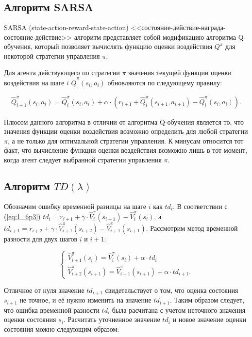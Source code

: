 \subsection{Алгоритм SARSA} \label{subsect1_6_3}
SARSA (state-action-reward-state-action) <<состояние-действие-награда-состояние-действие>> алгоритм представляет собой модификацию алгоритма Q-обучения, который позволяет вычислять функцию оценки воздействия $ Q^{\pi} $ для некоторой стратегии управления $ \pi $. 

Для агента действующего по стратегии $ \pi $ значения текущей функции оценки воздействия на шаге $ i $ $ \hat{Q}^{\pi}(s_i, a_i) $ обновляются по следующему правилу:

\begin{equation}
\label{eq:1_6p5}
\begin{alignedat}{2}
\hat{Q}^{\pi}_{i+1}(s_i, a_i) = \hat{Q}^{\pi}_{i}(s_i, a_i)+\alpha\cdot ( r_{i+1} + \hat{Q}^{\pi}_{i}(s_{i+1}, a_{i+1}) - \hat{Q}^{\pi}_{i}(s_{i}, a_i)).
\end{alignedat}
\end{equation}

Плюсом данного алгоритма в отличии от алгоритма Q-обучения является то, что значения функции оценки воздействия возможно определить для любой стратегии $ \pi $, а не только для оптимальной стратегии управления. К минусам относится тот факт, что вычисление функции оценки воздействия возможно лишь в тот момент, когда агент следует выбранной стратегии управления $ \pi $.

\subsection{Алгоритм $TD(\lambda)$} \label{subsect1_6_4}

Обозначим ошибку временной разницы на шаге $ i $ как $ td_i $. В соответствии с (\ref{eq:1_6p3}) $ td_i = r_{i+1} + \gamma\cdot\hat{V}^{\pi}_{i}(s_{i+1})-\hat{V}^{\pi}_{i}(s_{i}) $,   а $ td_{i+1} = r_{i+2} + \gamma\cdot\hat{V}^{\pi}_{i+1}(s_{i+2})-\hat{V}^{\pi}_{i+1}(s_{i+1}) $. Рассмотрим метод временной разности для двух шагов $ i $ и $ i+1 $:

$$
 \begin{cases}
  \hat{V}^{\pi}_{i+1}(s_i) = \hat{V}^{\pi}_{i}(s_i)+\alpha\cdot td_i \\
  \hat{V}^{\pi}_{i+2}(s_{i+1}) = \hat{V}^{\pi}_{i+1}(s_{i+1})+\alpha\cdot td_{i+1}.
 \end{cases}
$$

Отличное от нуля значение $ td_{i+1} $ свидетельствует о том, что оценка состояния $ s_{i+1} $ не точное, и её нужно изменить на значение $ td_{i+1} $. Таким образом следует, что ошибка временной разности $ td_i $ была расчитана с учетом неточного значения оценки состояния $ s_i $. Расчитать уточненное значение $ td_i $ и новое значение оценки состояния можно следующим образом:

